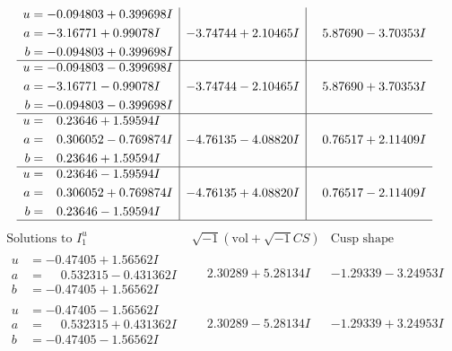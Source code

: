 \documentclass[1p]{elsarticle_modified}
\theoremstyle{definition}
\newcommand{\I}{\sqrt{-1}}
\begin{document}
$$\begin{array}{c|c|c}
\begin{aligned}
u &= -0.094803 + 0.399698 I \\
a &= -3.16771 + 0.99078 I \\
b &= -0.094803 + 0.399698 I\end{aligned}
 & -3.74744 + 2.10465 I & \phantom{-}5.87690 - 3.70353 I \\ \hline\begin{aligned}
u &= -0.094803 - 0.399698 I \\
a &= -3.16771 - 0.99078 I \\
b &= -0.094803 - 0.399698 I\end{aligned}
 & -3.74744 - 2.10465 I & \phantom{-}5.87690 + 3.70353 I \\ \hline\begin{aligned}
u &= \phantom{-}0.23646 + 1.59594 I \\
a &= \phantom{-}0.306052 - 0.769874 I \\
b &= \phantom{-}0.23646 + 1.59594 I\end{aligned}
 & -4.76135 - 4.08820 I & \phantom{-}0.76517 + 2.11409 I \\ \hline\begin{aligned}
u &= \phantom{-}0.23646 - 1.59594 I \\
a &= \phantom{-}0.306052 + 0.769874 I \\
b &= \phantom{-}0.23646 - 1.59594 I\end{aligned}
 & -4.76135 + 4.08820 I & \phantom{-}0.76517 - 2.11409 I\\
 \hline 
 \end{array}$$\newpage$$\begin{array}{c|c|c}  
\text{Solutions to }I^u_{1}& \I (\text{vol} + \sqrt{-1}CS) & \text{Cusp shape}\\
 \hline 
\begin{aligned}
u &= -0.47405 + 1.56562 I \\
a &= \phantom{-}0.532315 - 0.431362 I \\
b &= -0.47405 + 1.56562 I\end{aligned}
 & \phantom{-}2.30289 + 5.28134 I & -1.29339 - 3.24953 I \\ \hline\begin{aligned}
u &= -0.47405 - 1.56562 I \\
a &= \phantom{-}0.532315 + 0.431362 I \\
b &= -0.47405 - 1.56562 I\end{aligned}
 & \phantom{-}2.30289 - 5.28134 I & -1.29339 + 3.24953 I \\ \hline\begin{aligned}

\end{aligned}
\end{array}$$
\end{document}
